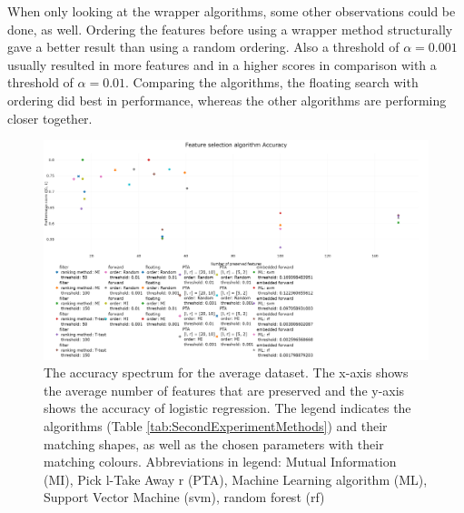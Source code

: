 \documentclass[10pt,a4paper]{article}
\begin{document}
	When only looking at the wrapper algorithms, some other observations could be done, as well. Ordering the features before using a wrapper method structurally gave a better result than using a random ordering. Also a threshold of $\alpha = 0.001$ usually resulted in more features and in a higher scores in comparison with a threshold of $\alpha = 0.01$. Comparing the algorithms, the floating search with ordering did best in performance, whereas the other algorithms are performing closer together.
	
	\begin{figure}[H]
		\centering
		\includegraphics[angle=90,height=1.4\textwidth]{Accuracy_new.png}
		\caption{The accuracy spectrum for the average dataset. The x-axis shows the average number of features that are preserved and the y-axis shows the accuracy of logistic regression. The legend indicates the algorithms (Table \ref{tab:SecondExperimentMethods}) and their matching shapes, as well as the chosen parameters with their matching colours. Abbreviations in legend: Mutual Information (MI), Pick l-Take Away r (PTA), Machine Learning algorithm (ML), Support Vector Machine (svm), random forest (rf)}
		\label{fig:Avg_Accuracy_Spectrum}
	\end{figure}
\end{document}
